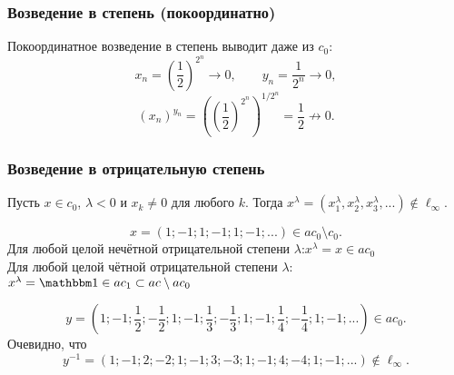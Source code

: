 \begin{frame}\frametitle{Возведение в степень (покоординатно)}
	Покоординатное возведение в степень выводит даже из $c_0$:
	\begin{equation}
		x_n = \left(\frac12\right)^{2^n} \to 0, \qquad
		y_n = \frac1{2^n} \to 0,
	\end{equation}
	\begin{equation}
		(x_n)^{y_n} = \left(\left(\frac12\right)^{2^n}\right)^{1/2^n}  = \frac12 \not \to 0
		.
	\end{equation}


\end{frame}



\begin{frame}\frametitle{Возведение в отрицательную степень}
	\begin{llemma}
		Пусть $x\in c_0$, $\lambda< 0$ и $x_k\ne 0 $ для любого $k$.
		Тогда
		$
			x^\lambda = (x_1^\lambda,x_2^\lambda,x_3^\lambda,...) \notin \ell_\infty
			.
		$
	\end{llemma}

	\begin{eexample}
		\begin{equation}
			x = (1;-1;1;-1;1;-1;...) \in ac_0 \setminus c_0
			.
		\end{equation}
		Для любой целой нечётной отрицательной степени $\lambda$:\quad $x^\lambda = x \in ac_0$
		\\
		Для любой целой чётной отрицательной степени $\lambda$:\quad\quad
		$
			x^\lambda  = \one \in ac_1 \subset ac \setminus ac_0
		$
	\end{eexample}

	\begin{eexample}
		\begin{equation}
			y = \left(1;-1;\frac12;-\frac12;1;-1;\frac13;-\frac13;1;-1;\frac14;-\frac14;1;-1;...\right) \in ac_0
			.
		\end{equation}
		Очевидно, что
		\begin{equation}
			y^{-1} = \left(1;-1;2;-2;1;-1;3;-3;1;-1;4;-4;1;-1;...\right)  \notin \ell_\infty
			.
		\end{equation}
	\end{eexample}

\end{frame}




